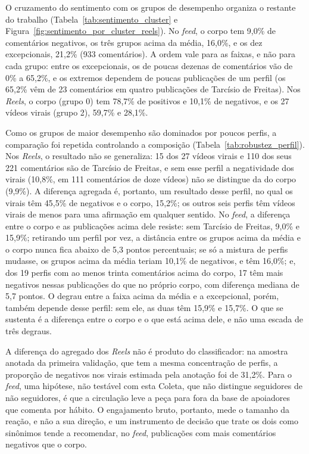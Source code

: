 O cruzamento do sentimento com os grupos de desempenho organiza o restante do trabalho (Tabela~\ref{tab:sentimento_cluster} e Figura~\ref{fig:sentimento_por_cluster_reels}). No \emph{feed}, o corpo tem 9,0\% de comentários negativos, os três grupos acima da média, 16,0\%, e os dez excepcionais, 21,2\% (933 comentários). A ordem vale para as faixas, e não para cada grupo: entre os excepcionais, os de poucas dezenas de comentários vão de 0\% a 65,2\%, e os extremos dependem de poucas publicações de um perfil (os 65,2\% vêm de 23 comentários em quatro publicações de Tarcísio de Freitas). Nos \emph{Reels}, o corpo (grupo 0) tem 78,7\% de positivos e 10,1\% de negativos, e os 27 vídeos virais (grupo 2), 59,7\% e 28,1\%.

Como os grupos de maior desempenho são dominados por poucos perfis, a comparação foi repetida controlando a composição (Tabela~\ref{tab:robustez_perfil}). Nos \emph{Reels}, o resultado não se generaliza: 15 dos 27 vídeos virais e 110 dos seus 221 comentários são de Tarcísio de Freitas, e sem esse perfil a negatividade dos virais (10,8\%, em 111 comentários de doze vídeos) não se distingue da do corpo (9,9\%). A diferença agregada é, portanto, um resultado desse perfil, no qual os virais têm 45,5\% de negativos e o corpo, 15,2\%; os outros seis perfis têm vídeos virais de menos para uma afirmação em qualquer sentido. No \emph{feed}, a diferença entre o corpo e as publicações acima dele resiste: sem Tarcísio de Freitas, 9,0\% e 15,9\%; retirando um perfil por vez, a distância entre os grupos acima da média e o corpo nunca fica abaixo de 5,3 pontos percentuais; se só a mistura de perfis mudasse, os grupos acima da média teriam 10,1\% de negativos, e têm 16,0\%; e, dos 19 perfis com ao menos trinta comentários acima do corpo, 17 têm mais negativos nessas publicações do que no próprio corpo, com diferença mediana de 5,7 pontos. O degrau entre a faixa acima da média e a excepcional, porém, também depende desse perfil: sem ele, as duas têm 15,9\% e 15,7\%. O que se sustenta é a diferença entre o corpo e o que está acima dele, e não uma escada de três degraus.

A diferença do agregado dos \emph{Reels} não é produto do classificador: na amostra anotada da primeira validação, que tem a mesma concentração de perfis, a proporção de negativos nos virais estimada pela anotação foi de 31,2\%. Para o \emph{feed}, uma hipótese, não testável com esta Coleta, que não distingue seguidores de não seguidores, é que a circulação leve a peça para fora da base de apoiadores que comenta por hábito. O engajamento bruto, portanto, mede o tamanho da reação, e não a sua direção, e um instrumento de decisão que trate os dois como sinônimos tende a recomendar, no \emph{feed}, publicações com mais comentários negativos que o corpo.

